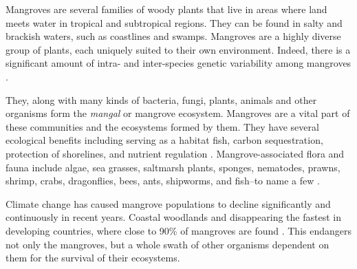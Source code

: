 Mangroves are several families of woody plants that live in areas where
land meets water in tropical and subtropical regions. They can be found
in salty and brackish waters, such as coastlines and swamps. Mangroves
are a highly diverse group of plants, each uniquely suited to their own
environment. Indeed, there is a significant amount of intra- and
inter-species genetic variability among mangroves \cite{biologyOfMangroves}.

They, along with many kinds of bacteria, fungi, plants, animals and
other organisms form the \emph{mangal} or mangrove ecosystem. Mangroves
are a vital part of these communities and the ecosystems formed by them.
They have several ecological benefits including serving as a habitat
fish, carbon sequestration, protection of shorelines, and nutrient
regulation \cite{roleOfMangroves}. Mangrove-associated flora and fauna include algae,
sea grasses, saltmarsh plants, sponges, nematodes, prawns, shrimp,
crabs, dragonflies, bees, ants, shipworms, and fish--to name a few \cite{biologyOfMangroves}.

Climate change has caused mangrove populations to decline significantly
and continuously in recent years. Coastal woodlands and disappearing the
fastest in developing countries, where close to 90\% of mangroves are
found \cite{kavanagh2007}. This endangers not only the mangroves, but a whole swath
of other organisms dependent on them for the survival of their
ecosystems.